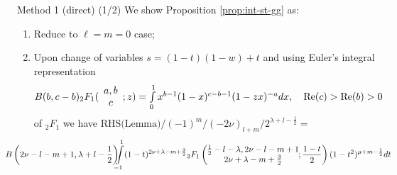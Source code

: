 \documentclass[pdf,notes]{beamer}
\begin{document}
\begin{frame}{Method 1 (direct) (1/2)}
	\scriptsize
	We show Proposition \ref{prop:int-st-gg} as:
	\begin{enumerate}
		\item Reduce to $\ell=m=0$ case;
		\item Upon change of variables $s=(1-t)(1-w)+t$ and using Euler's integral representation 
					\vspace{-0.2cm}
				\begin{equation*}
					B(b,c-b){}_2F_1(\begin{array}[]{c}
						a,b\\c
					\end{array};z)=\textstyle\int_0^1x^{b-1}(1-x)^{c-b-1}(1-zx)^{-a}dx,\quad\Re(c)>\Re(b)>0
					\vspace{-0.2cm}
				\end{equation*}
				of ${}_2F_1$
			we have ${\mbox{RHS(Lemma)}}/{(-1)^m/(-2\nu)_{l+m}}/2^{\lambda+l-\frac{1}{2}} =$
			\vspace{-0.2cm}
			\begin{equation}
				\kern-1.2cm
				B \left( 2\nu-l-m+1, \lambda+l-\frac{1}{2} \right)
				\kern-0.2cm\int_{-1}^1 (1 - t)^{2 \nu+\lambda-m+\frac{3}{2}} {}_2 F_1 \left( \kern-0.2cm\begin{array}{c}
					\frac{1}{2}-l-\lambda, 2\nu-l-m+1\\
					2 \nu+\lambda-m+\frac{3}{2}
				\end{array}\kern-0.2cm ; \frac{1 - t}{2} \right)(1-t^2)^{\mu+m-\frac{1}{2}}dt
				\label{eqn:m1-2}
			\end{equation}


\end{enumerate}
\end{frame}
\end{document}
